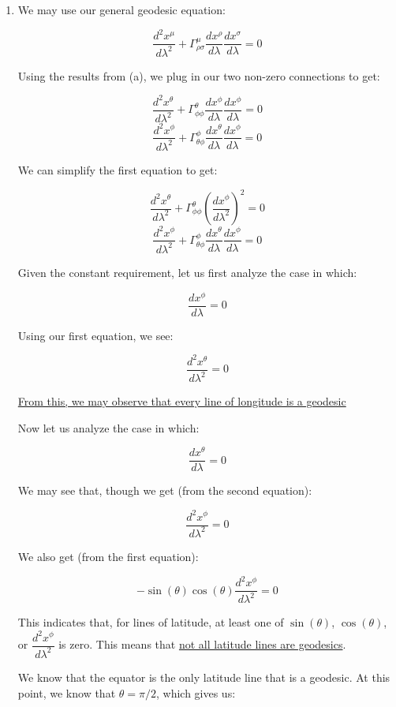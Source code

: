 \begin{enumerate}
\begin{enumerate}
      \item 

        We may use our general geodesic equation:

        $$\frac{d^2x^{\mu}}{d\lambda^2}+\Gamma^{\mu}_{\rho\sigma}\frac{dx^{\rho}}{d\lambda}\frac{dx^{\sigma}}{d\lambda}=0$$

        Using the results from (a), we plug in our two non-zero connections to get:

        $$\frac{d^2x^{\theta}}{d\lambda^2}+\Gamma^{\theta}_{\phi\phi}\frac{dx^{\phi}}{d\lambda}\frac{dx^{\phi}}{d\lambda}=0$$
        $$\frac{d^2x^{\phi}}{d\lambda^2}+\Gamma^{\phi}_{\theta\phi}\frac{dx^{\theta}}{d\lambda}\frac{dx^{\phi}}{d\lambda}=0$$

        We can simplify the first equation to get:

        $$\frac{d^2x^{\theta}}{d\lambda^2}+\Gamma^{\theta}_{\phi\phi}\left(\frac{dx^{\phi}}{d\lambda^2}\right)^2=0$$
        $$\frac{d^2x^{\phi}}{d\lambda^2}+\Gamma^{\phi}_{\theta\phi}\frac{dx^{\theta}}{d\lambda}\frac{dx^{\phi}}{d\lambda}=0$$

        Given the constant requirement, let us first analyze the case in which:

        $$\frac{dx^{\phi}}{d\lambda}=0$$

        Using our first equation, we see:

        $$\boxed{\frac{d^2x^{\theta}}{d\lambda^2}=0}$$

        \underline{From this, we may observe that every line of longitude is a geodesic}

        Now let us analyze the case in which:

        $$\frac{dx^{\theta}}{d\lambda}=0$$

        We may see that, though we get (from the second equation):

        $$\boxed{\frac{d^2x^{\phi}}{d\lambda^2}=0}$$

        We also get (from the first equation):

        $$\boxed{-\sin(\theta)\cos(\theta)\frac{d^2x^{\phi}}{d\lambda^2}=0}$$

        This indicates that, for lines of latitude, at least one of $\sin(\theta)$, $\cos(\theta)$, or $\dfrac{d^2x^{\phi}}{d\lambda^2}$ is zero. This means that \underline{not all latitude lines are geodesics}.

        We know that the equator is the only latitude line that is a geodesic. At this point, we know that $\theta=\pi/2$, which gives us:


\end{enumerate}
\end{enumerate}
